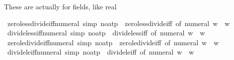 \begin{isabellebody}
\begin{isamarkuptext}%
These are actually for fields, like real%
\end{isamarkuptext}\isamarkuptrue%
\isamarkupfalse%
\ zero{\isacharunderscore}{\kern0pt}less{\isacharunderscore}{\kern0pt}divide{\isacharunderscore}{\kern0pt}iff{\isacharunderscore}{\kern0pt}numeral\ {\isacharbrackleft}{\kern0pt}simp{\isacharcomma}{\kern0pt}\ no{\isacharunderscore}{\kern0pt}atp{\isacharbrackright}{\kern0pt}\ {\isacharequal}{\kern0pt}\ zero{\isacharunderscore}{\kern0pt}less{\isacharunderscore}{\kern0pt}divide{\isacharunderscore}{\kern0pt}iff\ {\isacharbrackleft}{\kern0pt}of\ {\isachardoublequoteopen}numeral\ w{\isachardoublequoteclose}{\isacharbrackright}{\kern0pt}\ \ w\isanewline
{}\isamarkupfalse%
\ divide{\isacharunderscore}{\kern0pt}less{\isacharunderscore}{\kern0pt}{}{\isacharunderscore}{\kern0pt}iff{\isacharunderscore}{\kern0pt}numeral\ {\isacharbrackleft}{\kern0pt}simp{\isacharcomma}{\kern0pt}\ no{\isacharunderscore}{\kern0pt}atp{\isacharbrackright}{\kern0pt}\ {\isacharequal}{\kern0pt}\ divide{\isacharunderscore}{\kern0pt}less{\isacharunderscore}{\kern0pt}{}{\isacharunderscore}{\kern0pt}iff\ {\isacharbrackleft}{\kern0pt}of\ {\isachardoublequoteopen}numeral\ w{\isachardoublequoteclose}{\isacharbrackright}{\kern0pt}\ \ w\isanewline
{}\isamarkupfalse%
\ zero{\isacharunderscore}{\kern0pt}le{\isacharunderscore}{\kern0pt}divide{\isacharunderscore}{\kern0pt}iff{\isacharunderscore}{\kern0pt}numeral\ {\isacharbrackleft}{\kern0pt}simp{\isacharcomma}{\kern0pt}\ no{\isacharunderscore}{\kern0pt}atp{\isacharbrackright}{\kern0pt}\ {\isacharequal}{\kern0pt}\ zero{\isacharunderscore}{\kern0pt}le{\isacharunderscore}{\kern0pt}divide{\isacharunderscore}{\kern0pt}iff\ {\isacharbrackleft}{\kern0pt}of\ {\isachardoublequoteopen}numeral\ w{\isachardoublequoteclose}{\isacharbrackright}{\kern0pt}\ \ w\isanewline
{}\isamarkupfalse%
\ divide{\isacharunderscore}{\kern0pt}le{\isacharunderscore}{\kern0pt}{}{\isacharunderscore}{\kern0pt}iff{\isacharunderscore}{\kern0pt}numeral\ {\isacharbrackleft}{\kern0pt}simp{\isacharcomma}{\kern0pt}\ no{\isacharunderscore}{\kern0pt}atp{\isacharbrackright}{\kern0pt}\ {\isacharequal}{\kern0pt}\ divide{\isacharunderscore}{\kern0pt}le{\isacharunderscore}{\kern0pt}{}{\isacharunderscore}{\kern0pt}iff\ {\isacharbrackleft}{\kern0pt}of\ {\isachardoublequoteopen}numeral\ w{\isachardoublequoteclose}{\isacharbrackright}{\kern0pt}\ \ w%

\end{isabellebody}
